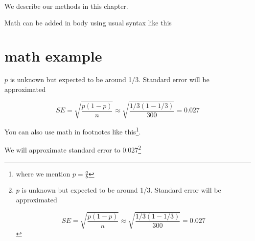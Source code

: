 \documentclass[
]{book}
\begin{document}
We describe our methods in this chapter.

Math can be added in body using usual syntax like this

\section{math example}\label{math-example}

\(p\) is unknown but expected to be around 1/3. Standard error will be approximated

\[
SE = \sqrt{\frac{p(1-p)}{n}} \approx \sqrt{\frac{1/3 (1 - 1/3)} {300}} = 0.027
\]

You can also use math in footnotes like this\footnote{where we mention \(p = \frac{a}{b}\)}.

We will approximate standard error to 0.027\footnote{\(p\) is unknown but expected to be around 1/3. Standard error will be approximated

  \[
  SE = \sqrt{\frac{p(1-p)}{n}} \approx \sqrt{\frac{1/3 (1 - 1/3)} {300}} = 0.027
  \]}

  
\end{document}
